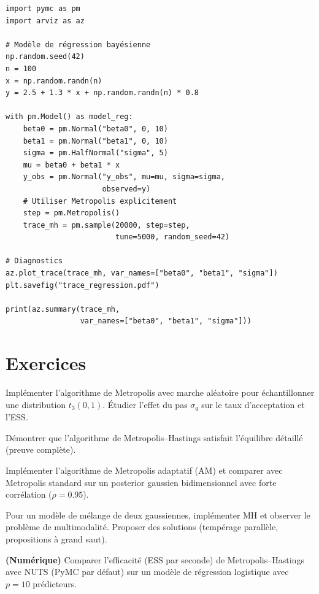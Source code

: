 \begin{codeblock}[title=\textbf{MH multidimensionnel avec PyMC}]
\begin{verbatim}
import pymc as pm
import arviz as az

# Modèle de régression bayésienne
np.random.seed(42)
n = 100
x = np.random.randn(n)
y = 2.5 + 1.3 * x + np.random.randn(n) * 0.8

with pm.Model() as model_reg:
    beta0 = pm.Normal("beta0", 0, 10)
    beta1 = pm.Normal("beta1", 0, 10)
    sigma = pm.HalfNormal("sigma", 5)
    mu = beta0 + beta1 * x
    y_obs = pm.Normal("y_obs", mu=mu, sigma=sigma,
                      observed=y)
    # Utiliser Metropolis explicitement
    step = pm.Metropolis()
    trace_mh = pm.sample(20000, step=step,
                         tune=5000, random_seed=42)

# Diagnostics
az.plot_trace(trace_mh, var_names=["beta0", "beta1", "sigma"])
plt.savefig("trace_regression.pdf")

print(az.summary(trace_mh,
                 var_names=["beta0", "beta1", "sigma"]))
\end{verbatim}
\end{codeblock}

\section{Exercices}

\begin{exercice}
Impl\'ementer l'algorithme de Metropolis avec marche al\'eatoire pour
\'echantillonner une distribution $t_3(0, 1)$. \'Etudier l'effet du
pas $\sigma_q$ sur le taux d'acceptation et l'ESS.
\end{exercice}

\begin{exercice}
D\'emontrer que l'algorithme de Metropolis--Hastings satisfait
l'\'equilibre d\'etaill\'e (preuve compl\`ete).
\end{exercice}

\begin{exercice}
Impl\'ementer l'algorithme de Metropolis adaptatif (AM) et comparer
avec Metropolis standard sur un posterior gaussien bidimensionnel avec
forte corr\'elation ($\rho = 0.95$).
\end{exercice}

\begin{exercice}
Pour un mod\`ele de m\'elange de deux gaussiennes, impl\'ementer MH et
observer le probl\`eme de multimodalit\'e. Proposer des solutions
(temp\'erage parall\`ele, propositions \`a grand saut).
\end{exercice}

\begin{exercice}
\textbf{(Num\'erique)} Comparer l'efficacit\'e (ESS par seconde) de
Metropolis--Hastings avec NUTS (PyMC par d\'efaut) sur un mod\`ele de
r\'egression logistique avec $p = 10$ pr\'edicteurs.
\end{exercice}
